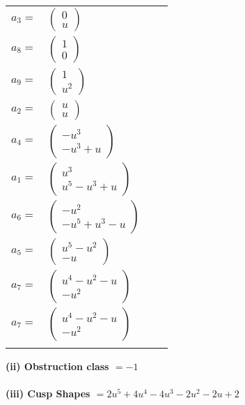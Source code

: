 \documentclass[1p]{elsarticle_modified}
\theoremstyle{definition}
\begin{document}
\begin{tabular}{m{7pt} m{180pt} m{7pt} m{180pt} }
\flushright $a_{3}=$&$\begin{pmatrix}0\\u\end{pmatrix}$ \\
\flushright $a_{8}=$&$\begin{pmatrix}1\\0\end{pmatrix}$ \\
\flushright $a_{9}=$&$\begin{pmatrix}1\\u^2\end{pmatrix}$ \\
\flushright $a_{2}=$&$\begin{pmatrix}u\\u\end{pmatrix}$ \\
\flushright $a_{4}=$&$\begin{pmatrix}- u^3\\- u^3+u\end{pmatrix}$ \\
\flushright $a_{1}=$&$\begin{pmatrix}u^3\\u^5- u^3+u\end{pmatrix}$ \\
\flushright $a_{6}=$&$\begin{pmatrix}- u^2\\- u^5+u^3- u\end{pmatrix}$ \\
\flushright $a_{5}=$&$\begin{pmatrix}u^5- u^2\\- u\end{pmatrix}$ \\
\flushright $a_{7}=$&$\begin{pmatrix}u^4- u^2- u\\- u^2\end{pmatrix}$\\ \flushright $a_{7}=$&$\begin{pmatrix}u^4- u^2- u\\- u^2\end{pmatrix}$\\&\end{tabular}
\flushleft \textbf{(ii) Obstruction class $= -1$}\\~\\
\flushleft \textbf{(iii) Cusp Shapes $= 2 u^5+4 u^4-4 u^3-2 u^2-2 u+2$}\\~\\
\end{document}
